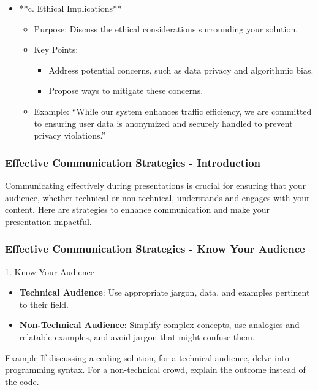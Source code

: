 \documentclass[aspectratio=169]{beamer}
\begin{document}
\begin{frame}[fragile]
\begin{itemize}
        \item **c. Ethical Implications**
            \begin{itemize}
                \item Purpose: Discuss the ethical considerations surrounding your solution.
                \item Key Points: 
                    \begin{itemize}
                        \item Address potential concerns, such as data privacy and algorithmic bias.
                        \item Propose ways to mitigate these concerns.
                    \end{itemize}
                \item Example: ``While our system enhances traffic efficiency, we are committed to ensuring user data is anonymized and securely handled to prevent privacy violations.''
            \end{itemize}
    \end{itemize}
\end{frame}

\begin{frame}[fragile]
    \frametitle{Effective Communication Strategies - Introduction}
    Communicating effectively during presentations is crucial for ensuring that your audience, whether technical or non-technical, understands and engages with your content. Here are strategies to enhance communication and make your presentation impactful.
\end{frame}

\begin{frame}[fragile]
    \frametitle{Effective Communication Strategies - Know Your Audience}
    \begin{block}{1. Know Your Audience}
        \begin{itemize}
            \item \textbf{Technical Audience}: Use appropriate jargon, data, and examples pertinent to their field.
            \item \textbf{Non-Technical Audience}: Simplify complex concepts, use analogies and relatable examples, and avoid jargon that might confuse them.
        \end{itemize}
    \end{block}
    
    \begin{block}{Example}
        If discussing a coding solution, for a technical audience, delve into programming syntax. For a non-technical crowd, explain the outcome instead of the code.
    \end{block}
\end{frame}
\end{document}
